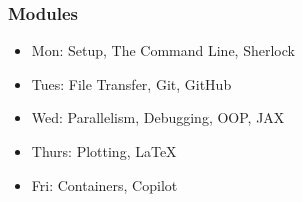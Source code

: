 \documentclass[aspectratio=169]{beamer}
\begin{document}
\begin{frame}[t]
	\frametitle{Modules}
	\begin{itemize}
		\item Mon: Setup, The Command Line, Sherlock
		\item Tues: File Transfer, Git, GitHub
		\item Wed: Parallelism, Debugging, OOP, JAX
		\item Thurs: Plotting, LaTeX
		\item Fri: Containers, Copilot
	\end{itemize}
\end{frame}
\end{document}
